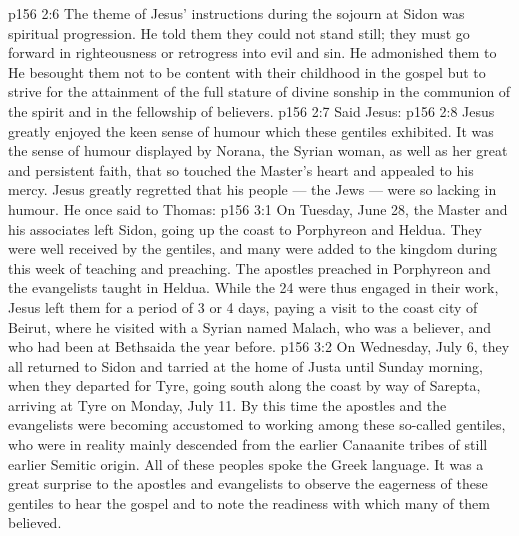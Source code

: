 \vs p156 2:6 \pc The theme of Jesus’ instructions during the sojourn at Sidon was spiritual progression. He told them they could not stand still; they must go forward in righteousness or retrogress into evil and sin. He admonished them to  He besought them not to be content with their childhood in the gospel but to strive for the attainment of the full stature of divine sonship in the communion of the spirit and in the fellowship of believers.
\vs p156 2:7 Said Jesus: 
\vs p156 2:8 Jesus greatly enjoyed the keen sense of humour which these gentiles exhibited. It was the sense of humour displayed by Norana, the Syrian woman, as well as her great and persistent faith, that so touched the Master’s heart and appealed to his mercy. Jesus greatly regretted that his people --- the Jews --- were so lacking in humour. He once said to Thomas: 
\vs p156 3:1 On Tuesday, June 28, the Master and his associates left Sidon, going up the coast to Porphyreon and Heldua. They were well received by the gentiles, and many were added to the kingdom during this week of teaching and preaching. The apostles preached in Porphyreon and the evangelists taught in Heldua. While the 24 were thus engaged in their work, Jesus left them for a period of 3 or 4 days, paying a visit to the coast city of Beirut, where he visited with a Syrian named Malach, who was a believer, and who had been at Bethsaida the year before.
\vs p156 3:2 On Wednesday, July 6, they all returned to Sidon and tarried at the home of Justa until Sunday morning, when they departed for Tyre, going south along the coast by way of Sarepta, arriving at Tyre on Monday, July 11. By this time the apostles and the evangelists were becoming accustomed to working among these so\hyp{}called gentiles, who were in reality mainly descended from the earlier Canaanite tribes of still earlier Semitic origin. All of these peoples spoke the Greek language. It was a great surprise to the apostles and evangelists to observe the eagerness of these gentiles to hear the gospel and to note the readiness with which many of them believed.
